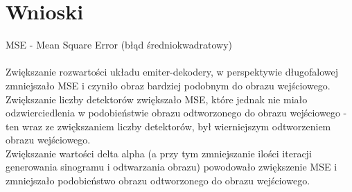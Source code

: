 \documentclass[a4paper,11pt]{article}
\begin{document}
\section{Wnioski}
MSE - Mean Square Error (błąd średniokwadratowy)\\\\
Zwiększanie rozwartości układu emiter-dekodery, w perspektywie długofalowej zmniejszało MSE i czyniło obraz bardziej podobnym do obrazu wejściowego.\\
Zwiększanie liczby detektorów zwiększało MSE, które jednak nie miało odzwierciedlenia w podobieństwie obrazu odtworzonego do obrazu wejściowego - ten wraz ze zwiększaniem liczby detektorów, był wierniejszym odtworzeniem obrazu wejściowego.\\
Zwiększanie wartości delta alpha (a przy tym zmniejszanie ilości iteracji generowania sinogramu i odtwarzania obrazu) powodowało zwiększenie MSE i zmniejszało podobieństwo obrazu odtworzonego do obrazu wejściowego.
\end{document}

